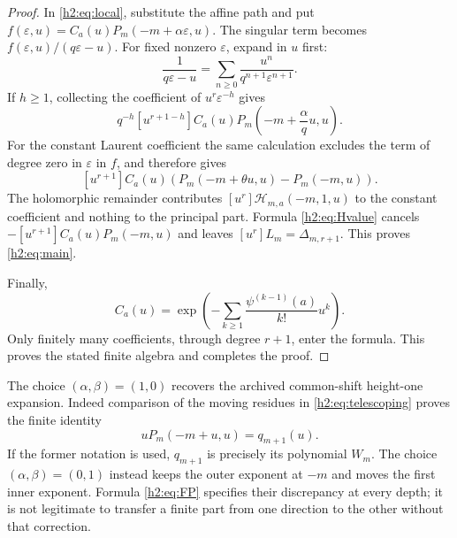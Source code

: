 \documentclass[11pt,a4paper]{article}
\theoremstyle{definition}
\theoremstyle{remark}
\numberwithin{equation}{section}
\begin{document}
\begin{proof}
In \eqref{h2:eq:local}, substitute the affine path and put
$f(\varepsilon,u)=C_a(u)P_m(-m+\alpha\varepsilon,u)$. The singular
term becomes $f(\varepsilon,u)/(q\varepsilon-u)$. For fixed nonzero
$\varepsilon$, expand in $u$ first:
\[
 \frac1{q\varepsilon-u}
    =\sum_{n\ge0}\frac{u^n}{q^{n+1}\varepsilon^{n+1}}.
\]
If $h\ge1$, collecting the coefficient of
$u^r\varepsilon^{-h}$ gives
\[
 q^{-h}[u^{r+1-h}]
       C_a(u)P_m\left(-m+\frac{\alpha}{q}u,u\right).
\]
For the constant Laurent coefficient the same calculation excludes the
term of degree zero in $\varepsilon$ in $f$, and therefore gives
\[
 [u^{r+1}]C_a(u)
   \left(P_m(-m+\theta u,u)-P_m(-m,u)\right).
\]
The holomorphic remainder contributes
$[u^r]\mathcal H_{m,a}(-m,1,u)$ to the constant coefficient and
nothing to the principal part. Formula \eqref{h2:eq:Hvalue} cancels
$-[u^{r+1}]C_a(u)P_m(-m,u)$ and leaves
$[u^r]L_m=\Delta_{m,r+1}$. This proves \eqref{h2:eq:main}.

Finally,
\[
 C_a(u)=\exp\left(-\sum_{k\ge1}
                  \frac{\psi^{(k-1)}(a)}{k!}u^k\right).
\]
Only finitely many coefficients, through degree $r+1$, enter the
formula. This proves the stated finite algebra and completes the proof.
\end{proof}

The choice $(\alpha,\beta)=(1,0)$ recovers the archived common-shift
height-one expansion. Indeed comparison of the moving residues in
\eqref{h2:eq:telescoping} proves the finite identity
\begin{equation}\label{h2:eq:recovery}
 uP_m(-m+u,u)=q_{m+1}(u).
\end{equation}
If the former notation is used, $q_{m+1}$ is precisely its polynomial
$W_m$. The choice $(\alpha,\beta)=(0,1)$ instead keeps the outer
exponent at $-m$ and moves the first inner exponent. Formula
\eqref{h2:eq:FP} specifies their discrepancy at every depth; it is
not legitimate to transfer a finite part from one direction to the
other without that correction.
\end{document}
